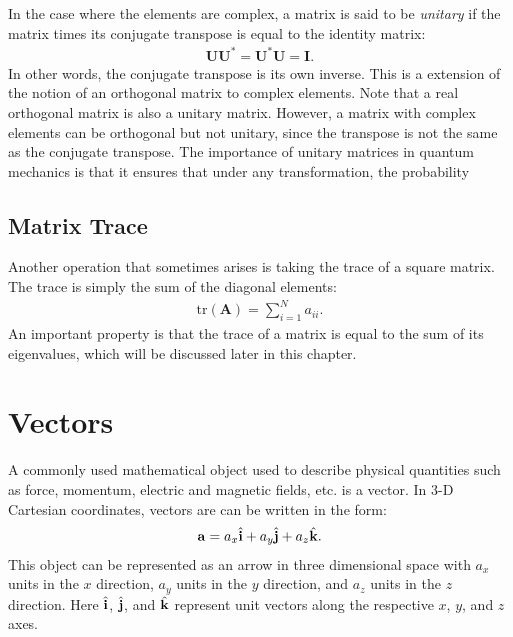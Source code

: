 In the case where the elements are complex, a matrix is said to be \emph{unitary} if the matrix times its conjugate transpose is equal to the identity matrix:
\begin{align}
  \mathbf{U} \mathbf{U}^* = \mathbf{U}^* \mathbf{U} = \mathbf{I} .
\end{align}
In other words, the conjugate transpose is its own inverse. This is a extension of the notion of an orthogonal matrix to complex elements. Note that a real orthogonal matrix is also a unitary matrix. However, a matrix with complex elements can be orthogonal but not unitary, since the transpose is not the same as the conjugate transpose. The importance of unitary matrices in quantum mechanics is that it ensures that under any transformation, the probability 


\subsection{Matrix Trace} \label{Sec:linearAlgebra_Matrices_MatrixTrace}

Another operation that sometimes arises is taking the trace of a square matrix. The trace is simply the sum of the diagonal elements:
\begin{align}
  \text{tr}( \mathbf{A} ) = \sum_{i=1}^N a_{ii} .
\end{align}
An important property is that the trace of a matrix is equal to the sum of its eigenvalues, which will be discussed later in this chapter.

\section{Vectors}

A commonly used mathematical object used to describe physical quantities such as force, momentum, electric and magnetic fields, etc. is a vector. In 3-D Cartesian coordinates, vectors are can be written in the form:
\begin{align}
  \mathbf{a} = a_x \hat{\mathbf{i}} + a_y \hat{\mathbf{j}} + a_z \hat{\mathbf{k}}.
\end{align}
This object can be represented as an arrow in three dimensional space with $a_x$ units in the $x$ direction, $a_y$ units in the $y$ direction, and $a_z$ units in the $z$ direction. Here $\hat{\mathbf{i}}$, $\hat{\mathbf{j}}$, and $\hat{\mathbf{k}}$ represent unit vectors along the respective $x$, $y$, and $z$ axes.

